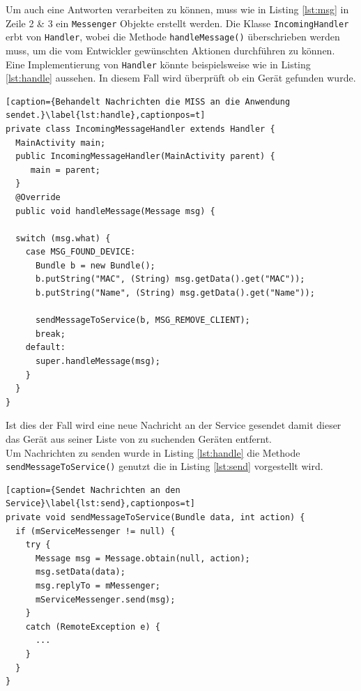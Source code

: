 \documentclass[]{report}
\begin{document}
 Um auch eine Antworten verarbeiten zu können, muss wie in Listing \ref{lst:msg} in Zeile 2 \& 3 ein \texttt{Messenger} Objekte erstellt werden. Die Klasse \texttt{IncomingHandler} erbt von \texttt{Handler}, wobei die Methode \texttt{handleMessage()} überschrieben werden muss, um die vom Entwickler gewünschten Aktionen durchführen zu können. Eine Implementierung von \texttt{Handler} könnte beispielsweise wie in Listing \ref{lst:handle} aussehen. In diesem Fall wird überprüft ob ein Gerät gefunden wurde. 
\begin{lstlisting}[caption={Behandelt Nachrichten die MISS an die Anwendung sendet.}\label{lst:handle},captionpos=t] 
private class IncomingMessageHandler extends Handler {
  MainActivity main;
  public IncomingMessageHandler(MainActivity parent) {
     main = parent;
  }
  @Override
  public void handleMessage(Message msg) {
  
  switch (msg.what) {
    case MSG_FOUND_DEVICE:
	  Bundle b = new Bundle();
	  b.putString("MAC", (String) msg.getData().get("MAC"));
	  b.putString("Name", (String) msg.getData().get("Name"));
	  
	  sendMessageToService(b, MSG_REMOVE_CLIENT);
      break;
    default:
      super.handleMessage(msg);
    }
  }
}
\end{lstlisting}
Ist dies der Fall wird eine neue Nachricht an der Service gesendet damit dieser das Gerät aus seiner Liste von zu suchenden Geräten entfernt.\\
Um Nachrichten zu senden wurde in Listing \ref{lst:handle} die Methode \texttt{sendMessageToService()} genutzt die in Listing \ref{lst:send} vorgestellt wird. 
\begin{lstlisting}[caption={Sendet Nachrichten an den Service}\label{lst:send},captionpos=t] 
private void sendMessageToService(Bundle data, int action) {
  if (mServiceMessenger != null) {
    try {
      Message msg = Message.obtain(null, action);
      msg.setData(data);
      msg.replyTo = mMessenger;
      mServiceMessenger.send(msg);
    } 
    catch (RemoteException e) {
      ...
    }
  }
}
\end{lstlisting}
\end{document}
